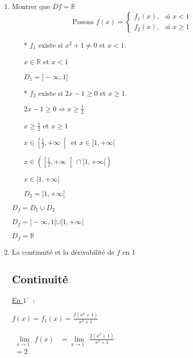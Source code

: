 \documentclass[12pt,a4paper]{article}
\begin{document}
\begin{enumerate}
    \item Montrer que $Df=\mathbb{R}$
          \[\text{Posons }
              f(x) =
              \begin{cases}
                  f_1(x), & \text{si } x < 1    \\[10pt]
                  f_2(x), & \text{si } x \geq 1
              \end{cases}
          \]
          \begin{itemize}
              \item[*] \( f_1 \) existe si \( x^2 + 1 \neq 0 \) et \( x < 1 \).

                  \( x \in \mathbb{R} \) et \( x < 1 \)

                  \( D_1 = ]-\infty, 1[ \)

              \item[*] \( f_2 \) existe si \( 2x -1 \geq 0 \) et \( x \geq 1 \).

                  \( 2x - 1 \geq 0 \Rightarrow x \geq \frac{1}{2} \)

                  \( x \geq \frac{1}{2} \) et \( x \geq 1 \)

                  \( x \in \left[ \frac{1}{2}, +\infty \right[ \text{ et } x\in[1, +\infty [ \)

                  \( x\in\left( \left[ \frac{1}{2}, +\infty \right[ \cap [1, +\infty [\right)  \)

                  \( x \in [1, +\infty[ \)

                  \(D_2 = [1, +\infty[\)
          \end{itemize}

          \(
          D_f = D_1 \cup D_2
          \)

          \(
          D_f = ]-\infty, 1[ \cup [1, +\infty[
          \)

          \(
          D_f = \mathbb{R}
          \)
    \item La continuité et la dérivabilité de \( f \) en 1

          \subsection*{Continuité}

          \underline{En \( 1^- \)} :

          \(
          f(x) = f_1(x) = \frac{2(x^3+1)}{x^2+1}
          \)

          \( \begin{aligned}
              \lim\limits_{x \to 1^-} f(x) & = \lim\limits_{x \to 1^-} \frac{2(x^3+1)}{x^2+1} \\
              = 2
          \end{aligned} \)


\end{enumerate}
\end{document}
